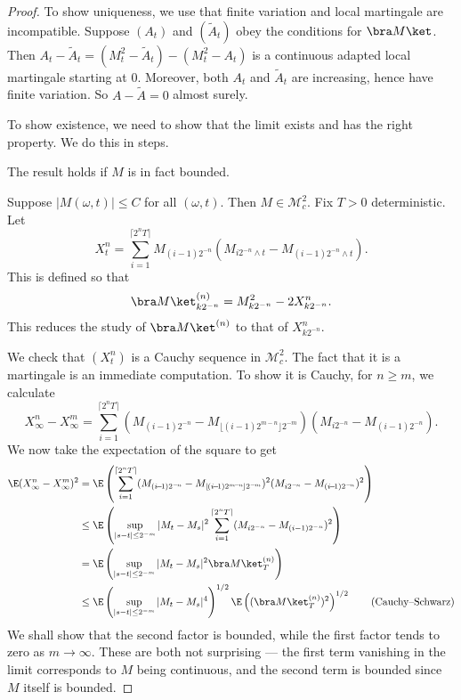 \documentclass[a4paper]{article}
\begin{document}
\begin{proof}
  To show uniqueness, we use that finite variation and local martingale are incompatible. Suppose $(A_t)$ and $(\tilde{A}_t)$ obey the conditions for $\bra M\ket$. Then $A_t - \tilde{A}_t = (M_t^2 - \tilde{A}_t) - (M_t^2 - A_t)$ is a continuous adapted local martingale starting at $0$. Moreover, both $A_t$ and $\tilde{A}_t$ are increasing, hence have finite variation. So $A - \tilde{A} = 0$ almost surely.

  To show existence, we need to show that the limit exists and has the right property. We do this in steps.
  \begin{claim}
    The result holds if $M$ is in fact bounded.
  \end{claim}
  Suppose $|M(\omega, t)| \leq C$ for all $(\omega, t)$. Then $M \in \mathcal{M}_c^2$. Fix $T > 0$ deterministic. Let
  \[
    X_t^n = \sum_{i = 1}^{\lceil 2^n T \rceil} M_{(i - 1)2^{-n}} (M_{i 2^{-n} \wedge t} - M_{(i - 1) 2^{-n} \wedge t}).
  \]
  This is defined so that
  \[
    \bra M \ket_{k2^{-n}}^{(n)} = M_{k2^{-n}}^2 - 2 X_{k 2^{-n}}^n.
  \]
  This reduces the study of $\bra M\ket^{(n)}$ to that of $X_{k2^{-n}}^n$.

  We check that $(X_t^n)$ is a Cauchy sequence in $\mathcal{M}_c^2$. The fact that it is a martingale is an immediate computation. To show it is Cauchy, for $n \geq m$, we calculate
  \[
    X_\infty^n - X_\infty^m = \sum_{i = 1}^{\lceil 2^n T\rceil} (M_{(i - 1)2^{-n}} - M_{\lfloor (i - 1) 2^{m - n}\rfloor 2^{-m}})(M_{i2^{-n}} - M_{(i - 1)2^{-n}}).
  \]
  We now take the expectation of the square to get
  \begin{align*}
    \E (X_\infty^n - X_\infty^m)^2 &= \E\left(\sum_{i = 1}^{\lceil 2^n T\rceil} (M_{(i\!-\!1)2^{-\!n}} - M_{\lfloor\!(i\!-\!1) 2^{m\!-\!n}\!\rfloor 2^{-\!m}})^2(M_{i 2^{-\!n}} - M_{(i\!-\!1)2^{-\!n}})^2\right)\\
    &\leq \E \left(\sup_{|s - t| \leq 2^{-m}} |M_t - M_s|^2 \sum_{i = 1}^{\lceil 2^n T\rceil} (M_{i2^{-n}} - M_{(i - 1)2^{-n}})^2\right)\\
    &= \E \left(\sup_{|s - t| \leq 2^{-m}} |M_t - M_s|^2 \bra M\ket_T^{(n)}\right)\\
    &\leq \E \left(\sup_{|s - t| \leq 2^{-m}}|M_t - M_s|^4\right)^{1/2}\E \left((\bra M\ket_T^{(n)})^2\right)^{1/2}\tag{Cauchy--Schwarz}
  \end{align*}
  We shall show that the second factor is bounded, while the first factor tends to zero as $m \to \infty$. These are both not surprising --- the first term vanishing in the limit corresponds to $M$ being continuous, and the second term is bounded since $M$ itself is bounded.


\end{proof}
\end{document}
